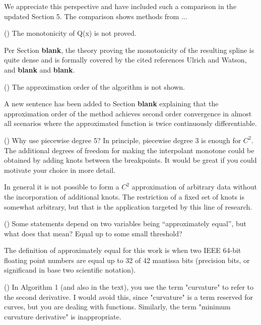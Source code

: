 We appreciate this perspective and have included such a comparison in the updated Section 5. The comparison shows methods from ...


{\parindent=20pt \it

\item{()} The monotonicity of Q(x) is not proved.

}

Per Section {\bf blank}, the theory proving the monotonicity of the resulting spline is quite dense and is formally covered by the cited references Ulrich and Watson, and {\bf blank} and {\bf blank}.

{\parindent=20pt \it

\item{()} The approximation order of the algorithm is not shown.

}

A new sentence has been added to Section {\bf blank} explaining that the approximation order of the method achieves second order convergence in almost all scenarios where the approximated function is twice continuously differentiable.

{\parindent=20pt \it

\item{()} Why use piecewise degree 5? In principle, piecewise degree 3 is enough for $C^2$. The additional degrees of freedom for making the interpolant monotone could be obtained by adding knots between the breakpoints. It would be great if you could motivate your choice in more detail.

}

In general it is not possible to form a $C^2$ approximation of arbitrary data without the incorporation of additional knots. The restriction of a fixed set of knots is somewhat arbitrary, but that is the application targeted by this line of research.


{\parindent=20pt \it

\item{()} Some statements depend on two variables being ``approximately equal'', but what does that mean? Equal up to some small threshold?

}

The definition of approximately equal for this work is when two IEEE 64-bit floating point numbers are equal up to 32 of 42 mantissa bits (precision bits, or significand in base two scientific notation).

{\parindent=20pt \it
  
\item{()} In Algorithm 1 (and also in the text), you use the term "curvature" to refer to the second derivative. I would avoid this, since "curvature" is a term reserved for curves, but you are dealing with functions. Similarly, the term "minimum curvature derivative" is inappropriate.

}

